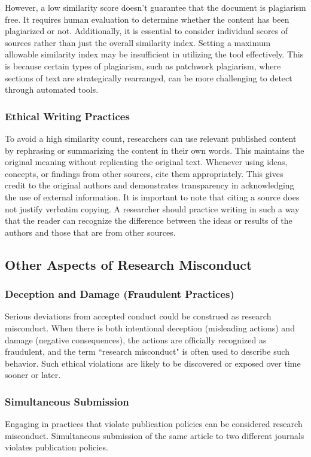 \documentclass{article}
\begin{document}
	\noindent However, a low similarity score doesn't guarantee that the document is plagiarism free.
	It requires human evaluation to determine whether the content has been plagiarized or not.
	Additionally, it is essential to consider individual scores of sources rather than just the overall
	similarity index.
	Setting a maximum allowable similarity index may be insufficient in utilizing the tool effectively.
	This is because certain types of plagiarism, such as patchwork plagiarism, where sections of text are
	strategically rearranged, can be more challenging to detect through automated tools.

	\subsubsection{Ethical Writing Practices}
	To avoid a high similarity count, researchers can use relevant published content by rephrasing or
	summarizing the content in their own words. This maintains the original meaning without replicating the
	original text.
	Whenever using ideas, concepts, or findings from other sources, cite them appropriately.
	This gives credit to the original authors and demonstrates transparency in acknowledging the use of
	external information.
	It is important to note that citing a source does not justify verbatim copying.
	A researcher should practice writing in such a way that the reader can recognize the difference between the
	ideas or results of the authors and those that are from other sources.

	\subsection{Other Aspects of Research Misconduct}
	\subsubsection{Deception and Damage (Fraudulent Practices)}
	Serious deviations from accepted conduct could be construed as research misconduct.
	When there is both intentional deception (misleading actions) and damage (negative consequences), the
	actions are officially recognized as fraudulent, and the term ``research misconduct" is often used to
	describe such behavior.
	Such ethical violations are likely to be discovered or exposed over time sooner or later.

	\subsubsection{Simultaneous Submission}
	Engaging in practices that violate publication policies can be considered research misconduct.
	Simultaneous submission of the same article to two different journals violates publication policies.
\end{document}

